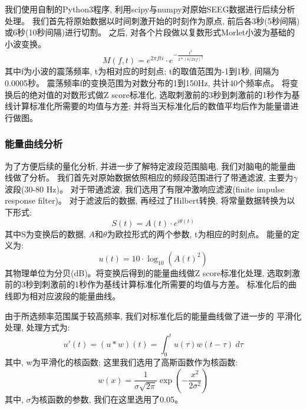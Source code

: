 我们使用自制的Python3程序, 利用scipy\cite{scipy}与numpy\cite{numpy,oliphant2007python}对原始SEEG数据进行后续分析处理。
我们首先将原始数据以时间刺激开始的时刻作为原点, 前后各3秒(5秒间隔)或6秒(10秒间隔)进行切割。
之后, 对各个片段做以复数形式Morlet小波为基础的小波变换。
\begin{equation}
    M(f, t) = e ^ {2 \pi f t i} \cdot e ^ {-\frac{t^2}{2 * (6 / 2 \pi f)^2}}
\end{equation}
其中f为小波的震荡频率, t为相对应的时刻点; t的取值范围为-1到1秒, 间隔为0.0005秒。
震荡频率f的变换范围为对数分布的1到150Hz, 共计40个频率点。
将变换后的绝对值的对数形式做Z score标准化, 选取刺激前的3秒到刺激前的1秒作为基线计算标准化所需要的均值与方差;
并将当天标准化后的数值平均后作为能量谱进行做图。

\subsubsection{能量曲线分析}
为了方便后续的量化分析, 并进一步了解特定波段范围脑电, 我们对脑电的能量曲线做了分析。
我们首先对原始数据依照相应的频段范围进行了带通滤波, 主要为$\gamma$波段(30-80 Hz)。
对于带通滤波, 我们选用了有限冲激响应滤波(finite impulse response filter)。
对于滤波后的数据, 再经过了Hilbert转换, 将常量数据转换为以下形式:
\begin{equation}
    S(t) = A(t) \cdot e^{i \theta(t)}
\end{equation}
其中S为变换后的数据, $A$和$\theta$为欧拉形式的两个参数, t为相应的时刻点。
能量的定义为:
\begin{equation}
    u(t) = 10 \cdot \log_{10}(A(t) ^ 2)
\end{equation}
其物理单位为分贝(dB)。将变换后得到的能量曲线做Z score标准化处理,
选取刺激前的3秒到刺激前的1秒作为基线计算标准化所需要的均值与方差。
标准化后的曲线即为相对应波段的能量曲线。

由于所选频率范围属于较高频率, 我们对标准化后的能量曲线做了进一步的
平滑化处理, 处理方式为:
\begin{equation}
    u'(t) = (u * w)(t) = \int_0^t u(\tau) w(t - \tau)\ d \tau
\end{equation}
其中, w为平滑化的核函数; 这里我们选用了高斯函数作为核函数:
\begin{equation}
    w(x) = \frac{1}{\sigma \sqrt{2 \pi}} \exp(- \frac{x^2}{2 \sigma^2})
\end{equation}
其中, \(\sigma\)为核函数的参数, 我们在这里选用了0.05。


